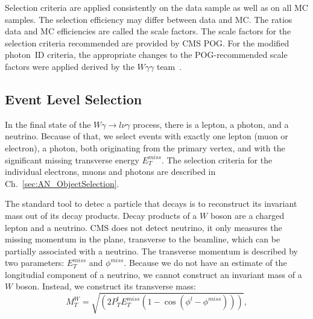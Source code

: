 Selection criteria are applied consistently on the data sample as well as on all MC samples. The selection efficiency may differ between data and MC. The ratios data and MC efficiencies are called the scale factors. The scale factors for the selection criteria recommended are provided by CMS POG. For the modified photon~ID criteria, the appropriate changes to the POG-recommended scale factors were applied derived by the $W\gamma\gamma$ team~\cite{ref_Wgg8TeV}.

\subsection{Event Level Selection}
\label{sec:AN_Selection_EventLevel}

In the final state of the $W\gamma\rightarrow l\nu\gamma$ process, there is a lepton, a photon, and a neutrino. Because of that, we select events with exactly one lepton (muon or electron), a photon, both originating from the primary vertex, and with the significant missing transverse energy $E_T^{miss}$. The selection criteria for the individual electrons, muons and photons are described in Ch.~\ref{sec:AN_ObjectSelection}.

The standard tool to detec a particle that decays is to reconstruct its invariant mass out of its decay products. Decay products of a $W$ boson are a charged lepton and a neutrino. CMS does not detect neutrino, it only measures the missing momentum in the plane, transverse to the beamline, which can be partially associated with a neutrino. The transverse momentum is described by two parameters: $E_T^{miss}$ and $\phi^{miss}$. Because we do not have an estimate of the longitudial component of a neutrino, we cannot construct an invariant mass of a $W$ boson. Instead, we construct its transverse mass:
\begin{equation}
M_T^W=\sqrt{(2  P_T^{l}  E_T^{miss}  (1-\cos{(\phi^{l}-\phi^{miss})}))},
\end{equation}

